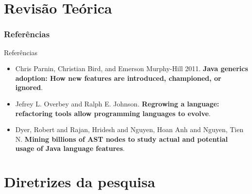 \documentclass[]{beamer}
\begin{document}
	\section{Revisão Teórica}
	\frametitle{Referências}
	\begin{frame}[label=referencias]
		\begin{block}{Referências}
			\begin{itemize}
				\item Chris Parnin, Christian Bird, and Emerson Murphy-Hill 2011. \textbf{Java generics adoption: How new features are introduced, championed, or ignored}.
				
				\item Jefrey L. Overbey and Ralph E. Johnson. \textbf{Regrowing a language: refactoring tools
				allow programming languages to evolve}.
				
				\item Dyer, Robert and Rajan, Hridesh and Nguyen, Hoan Anh and Nguyen, Tien N. \textbf{Mining billions of AST nodes to study actual and potential usage of Java language features}.
			\end{itemize}
			
		\end{block}
	\end{frame}
	




	\section{Diretrizes da pesquisa}

%			
%				
	
\end{document}
